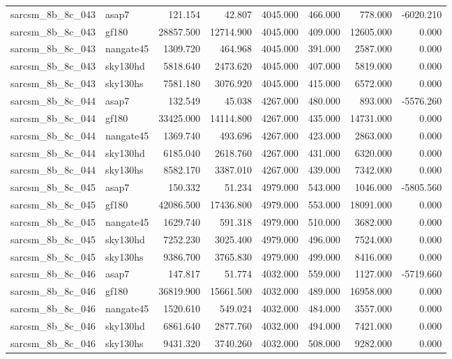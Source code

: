 \begin{tabular}{llrrrrrr}
sarcsm\_8b\_8c\_043 & asap7 & 121.154 & 42.807 & 4045.000 & 466.000 & 778.000 & -6020.210 \\
sarcsm\_8b\_8c\_043 & gf180 & 28857.500 & 12714.900 & 4045.000 & 409.000 & 12605.000 & 0.000 \\
sarcsm\_8b\_8c\_043 & nangate45 & 1309.720 & 464.968 & 4045.000 & 391.000 & 2587.000 & 0.000 \\
sarcsm\_8b\_8c\_043 & sky130hd & 5818.640 & 2473.620 & 4045.000 & 407.000 & 5819.000 & 0.000 \\
sarcsm\_8b\_8c\_043 & sky130hs & 7581.180 & 3076.920 & 4045.000 & 415.000 & 6572.000 & 0.000 \\
sarcsm\_8b\_8c\_044 & asap7 & 132.549 & 45.038 & 4267.000 & 480.000 & 893.000 & -5576.260 \\
sarcsm\_8b\_8c\_044 & gf180 & 33425.000 & 14114.800 & 4267.000 & 435.000 & 14731.000 & 0.000 \\
sarcsm\_8b\_8c\_044 & nangate45 & 1369.740 & 493.696 & 4267.000 & 423.000 & 2863.000 & 0.000 \\
sarcsm\_8b\_8c\_044 & sky130hd & 6185.040 & 2618.760 & 4267.000 & 431.000 & 6320.000 & 0.000 \\
sarcsm\_8b\_8c\_044 & sky130hs & 8582.170 & 3387.010 & 4267.000 & 439.000 & 7342.000 & 0.000 \\
sarcsm\_8b\_8c\_045 & asap7 & 150.332 & 51.234 & 4979.000 & 543.000 & 1046.000 & -5805.560 \\
sarcsm\_8b\_8c\_045 & gf180 & 42086.500 & 17436.800 & 4979.000 & 553.000 & 18091.000 & 0.000 \\
sarcsm\_8b\_8c\_045 & nangate45 & 1629.740 & 591.318 & 4979.000 & 510.000 & 3682.000 & 0.000 \\
sarcsm\_8b\_8c\_045 & sky130hd & 7252.230 & 3025.400 & 4979.000 & 496.000 & 7524.000 & 0.000 \\
sarcsm\_8b\_8c\_045 & sky130hs & 9386.700 & 3765.830 & 4979.000 & 499.000 & 8416.000 & 0.000 \\
sarcsm\_8b\_8c\_046 & asap7 & 147.817 & 51.774 & 4032.000 & 559.000 & 1127.000 & -5719.660 \\
sarcsm\_8b\_8c\_046 & gf180 & 36819.900 & 15661.500 & 4032.000 & 489.000 & 16958.000 & 0.000 \\
sarcsm\_8b\_8c\_046 & nangate45 & 1520.610 & 549.024 & 4032.000 & 484.000 & 3557.000 & 0.000 \\
sarcsm\_8b\_8c\_046 & sky130hd & 6861.640 & 2877.760 & 4032.000 & 494.000 & 7421.000 & 0.000 \\
sarcsm\_8b\_8c\_046 & sky130hs & 9431.320 & 3740.260 & 4032.000 & 508.000 & 9282.000 & 0.000 \\

\end{tabular}
